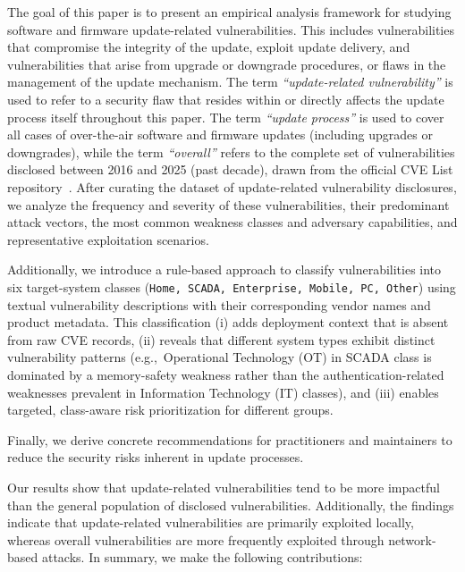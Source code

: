 \documentclass[fleqn,s1,names,tex]{neptune}
\begin{document}
The goal of this paper is to present an empirical analysis framework for studying software and firmware update-related vulnerabilities.
This includes vulnerabilities that compromise the integrity of the update, exploit update delivery, and vulnerabilities that arise from upgrade or downgrade procedures, or flaws in the management of the update mechanism.
The term \emph{``update-related vulnerability''} is used to refer to a security flaw that resides within or directly affects the update process itself throughout this paper.
The term \emph{``update process''} is used to cover all cases of over-the-air
software and firmware updates (including upgrades or downgrades), while the
term \emph{``overall''} refers to the complete set of vulnerabilities disclosed
between 2016 and 2025 (past decade), drawn from the official CVE List
repository~\citep{CVE_Program,CVE_List_V5}.
After curating the dataset of update-related vulnerability disclosures, we analyze the frequency and severity of these vulnerabilities, their predominant attack vectors, the most common weakness classes and adversary capabilities, and representative exploitation scenarios.



 

Additionally, we introduce a rule-based approach to classify vulnerabilities into six target-system classes (\texttt{Home, SCADA, Enterprise, Mobile, PC, Other}) using textual vulnerability descriptions with their corresponding vendor names and product metadata. 
This classification (i) adds deployment context that is absent from raw CVE records, (ii) reveals that different system types exhibit distinct vulnerability patterns (e.g.,~Operational Technology (OT) in SCADA class is dominated by a memory-safety weakness rather than the authentication-related weaknesses prevalent in Information Technology (IT) classes), and (iii) enables targeted, class-aware risk prioritization for different groups.






Finally,  we derive concrete recommendations for practitioners and maintainers to reduce the security risks inherent in update processes.


 
 

Our results show that update-related vulnerabilities tend to be more impactful than the general population of disclosed vulnerabilities. 
Additionally, the findings indicate that update-related vulnerabilities are primarily exploited locally, whereas overall vulnerabilities are more frequently exploited through network-based attacks.
In summary, we make the following  contributions:
\end{document}
